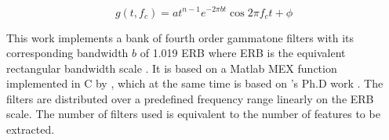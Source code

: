 \begin{equation}
    g(t, f_c) = a t^{n-1}e^{-2 \pi b t} \cos{2 \pi f_c t + \phi}
    \label{eq:gammatone-filter-impulse}
\end{equation}

This work implements a bank of fourth order gammatone filters with its
corresponding bandwidth $b$ of 1.019 ERB where ERB is the equivalent
rectangular bandwidth scale \cite{GLASBERG1990103}. It is based on a Matlab MEX
function implemented in C by \citeauthor{CorrelogramMa2007}
\cite{CorrelogramMa2007}, which at the same time is based on
\citeauthor{Cooke1993ModellingAP}'s Ph.D work \cite{Cooke1993ModellingAP}. The
filters are distributed over a predefined frequency range linearly on the ERB
scale. The number of filters used is equivalent to the number of features to be
extracted. 